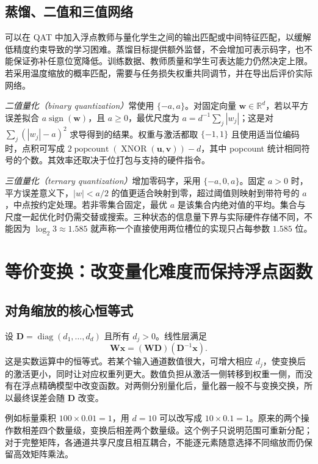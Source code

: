 \documentclass[UTF8,12pt,a4paper,fontset=fandol]{ctexart}
\begin{document}
\subsection{蒸馏、二值和三值网络}
可以在 QAT 中加入浮点教师与量化学生之间的输出匹配或中间特征匹配，以缓解低精度约束导致的学习困难。蒸馏目标提供额外监督，不会增加可表示码字，也不能保证弥补任意位宽降低。训练数据、教师质量和学生可表达能力仍然决定上限。若采用温度缩放的概率匹配，需要与任务损失权重共同调节，并在导出后评价实际网络。

\emph{二值量化（binary quantization）}常使用 $\{-a,a\}$。对固定向量 $\mathbf w\in\mathbb R^d$，若以平方误差拟合 $a\operatorname{sign}(\mathbf w)$，且 $a\geq0$，最优尺度为 $a=d^{-1}\sum_j|w_j|$；这是对 $\sum_j(|w_j|-a)^2$ 求导得到的结果。权重与激活都取 $\{-1,1\}$ 且使用适当位编码时，点积可写成 $2\operatorname{popcount}(\operatorname{XNOR}(\mathbf u,\mathbf v))-d$，其中 popcount 统计相同符号的个数。其效率还取决于位打包与支持的硬件指令。

\emph{三值量化（ternary quantization）}增加零码字，采用 $\{-a,0,a\}$。固定 $a>0$ 时，平方误差意义下，$|w|<a/2$ 的值更适合映射到零，超过阈值则映射到带符号的 $a$，中点按约定处理。若非零集合固定，最优 $a$ 是该集合内绝对值的平均。集合与尺度一起优化时仍需交替或搜索。三种状态的信息量下界与实际硬件存储不同，不能因为 $\log_2 3\approx1.585$ 就声称一个直接使用两位槽位的实现只占每参数 $1.585$ 位。

\section{等价变换：改变量化难度而保持浮点函数}
\label{sec:quant-transform}

\subsection{对角缩放的核心恒等式}
设 $\mathbf D=\operatorname{diag}(d_1,\ldots,d_d)$ 且所有 $d_j>0$。线性层满足
\begin{equation}
 \mathbf W\mathbf x=(\mathbf W\mathbf D)(\mathbf D^{-1}\mathbf x).
 \label{eq:quant-diagonal-transform}
\end{equation}
这是实数运算中的恒等式。若某个输入通道数值很大，可增大相应 $d_j$，使变换后的激活更小，同时让对应权重列更大。数值负担从激活一侧转移到权重一侧，而没有在浮点精确模型中改变函数。对两侧分别量化后，量化器一般不与变换交换，所以最终误差会随 $\mathbf D$ 改变。

例如标量乘积 $100\times0.01=1$，用 $d=10$ 可以改写成 $10\times0.1=1$。原来的两个操作数相差四个数量级，变换后相差两个数量级。这个例子只说明范围可重新分配；对于完整矩阵，各通道共享尺度且相互耦合，不能逐元素随意选择不同缩放而仍保留高效矩阵乘法。
\end{document}
